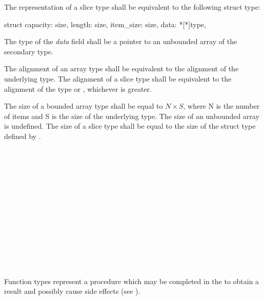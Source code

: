 \specsubsubitem
The representation of a slice type shall be equivalent to the following struct
type:

\begin{codesample}
struct {
	capacity: size,
	length: size,
	item_size: size,
	data: *[*]type,
}
\end{codesample}

The type of the \textit{data} field shall be a pointer to an unbounded array of
the secondary type.

\specsubsubitem
The alignment of an array type shall be equivalent to the alignment of the
underlying type. The alignment of a slice type shall be equivalent to the
alignment of the  type or , whichever is
greater.

\specsubsubitem
The size of a bounded array type shall be equal to $N \times S$, where N is the
number of items and S is the size of the underlying type. The size of an
unbounded array is undefined. The size of a slice type shall be equal to the
size of the struct type defined by .


\begin{grammar}
 \\
	  \\

 \\
	 \\
	\terminal{(}  \terminal{)}  \\

 \\
	 \optional{\terminal{,}} \\
	 \terminal{,}   \\
	 \terminal{,}  \\

 \\
	 \terminal{:}  \\
	 \\
\end{grammar}

\specsubsubitem
Function types represent a procedure which may be completed in the
 to obtain a result and possibly cause side
effects (see ).

